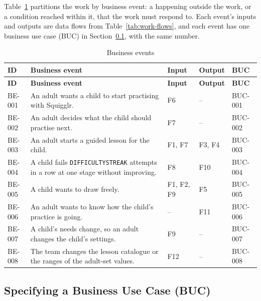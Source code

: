 \documentclass[12pt]{article}
\renewcommand{\_}{\textunderscore\allowbreak}%
\begin{document}
Table~\ref{tab:business-events} partitions the work by business event: a
happening outside the work, or a condition reached within it, that the work must
respond to. Each event's inputs and outputs are data flows from
Table~\ref{tab:work-flows}, and each event has one business use case (BUC) in
Section~\ref{sec:buc}, with the same number.

{\footnotesize
\setlength{\tabcolsep}{4pt}
\begin{longtable}{@{}
  >{\raggedright\arraybackslash}p{}
  >{\raggedright\arraybackslash}p{}
  >{\raggedright\arraybackslash}p{}
  >{\raggedright\arraybackslash}p{}
  >{\raggedright\arraybackslash}p{}@{}} \caption{Business
  events}\label{tab:business-events}\\
\toprule
\textbf{ID} & \textbf{Business event} & \textbf{Input} & \textbf{Output} &
\textbf{BUC} \\
\midrule
\endfirsthead
\toprule
\textbf{ID} & \textbf{Business event} & \textbf{Input} & \textbf{Output} &
\textbf{BUC} \\
\midrule
\endhead
\bottomrule
\endlastfoot
BE-001 & An adult wants a child to start practising with Squigglr. & F6 & -- &
BUC-001 \\
\addlinespace
BE-002 & An adult decides what the child should practise next. & F7 & -- &
BUC-002 \\
\addlinespace
BE-003 & An adult starts a guided lesson for the child. & F1, F7 & F3, F4 &
BUC-003 \\
\addlinespace
BE-004 & A child fails \texttt{DIFFICULTY\_STREAK} attempts in a row at one
stage without improving. & F8 & F10 & BUC-004 \\
\addlinespace
BE-005 & A child wants to draw freely. & F1, F2, F9 & F5 & BUC-005 \\
\addlinespace
BE-006 & An adult wants to know how the child's practice is going. & -- & F11 &
BUC-006 \\
\addlinespace
BE-007 & A child's needs change, so an adult changes the child's settings. & F9
& -- & BUC-007 \\
\addlinespace
BE-008 & The team changes the lesson catalogue or the ranges of the adult-set
values. & F12 & -- & BUC-008 \\
\end{longtable}
}

\subsection{Specifying a Business Use Case (BUC)}
\label{sec:buc}
\end{document}
